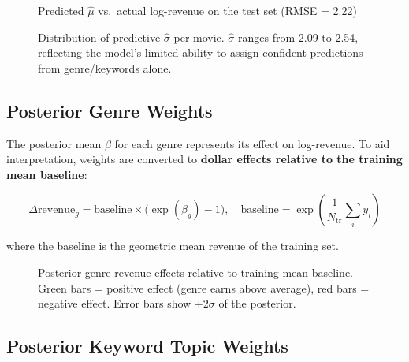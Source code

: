 \documentclass[12pt,a4paper]{article}
\begin{document}
\begin{figure}[H]
  \centering
  \caption{Predicted $\hat{\mu}$ vs.\ actual log-revenue on the test set (RMSE = 2.22)}
\end{figure}

\begin{figure}[H]
  \centering
  \caption{Distribution of predictive $\hat{\sigma}$ per movie.
  $\hat{\sigma}$ ranges from 2.09 to 2.54, reflecting the model's
  limited ability to assign confident predictions from genre/keywords alone.}
\end{figure}

\subsection{Posterior Genre Weights}

The posterior mean $\beta$ for each genre represents its effect on
log-revenue. To aid interpretation, weights are converted to
\textbf{dollar effects relative to the training mean baseline}:

\begin{equation}
  \Delta\text{revenue}_g
  = \text{baseline} \times \bigl(\exp(\beta_g) - 1\bigr),
  \quad
  \text{baseline} = \exp\!\left(\frac{1}{N_\text{tr}}\sum_i y_i\right)
\end{equation}

where the baseline is the geometric mean revenue of the training set.

\begin{figure}[H]
  \centering
  \caption{Posterior genre revenue effects relative to training mean baseline.
  Green bars = positive effect (genre earns above average),
  red bars = negative effect. Error bars show $\pm 2\sigma$ of the posterior.}
\end{figure}

\subsection{Posterior Keyword Topic Weights}
\end{document}
